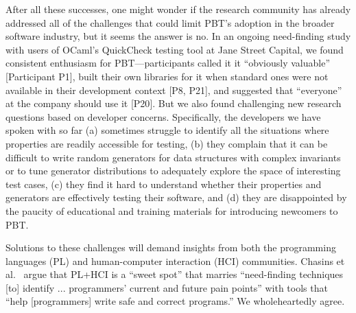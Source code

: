 \newcommand{\participant}[1]{{P#1}}

After all these successes, one might wonder if the research community has already
addressed all of the challenges that could limit PBT's adoption
in the broader software industry, but it
seems the answer is no.
In an ongoing need-finding study with users of OCaml's QuickCheck testing tool
at Jane Street Capital, we found
consistent enthusiasm for PBT---participants called it it
``obviously valuable'' [Participant \participant{1}],
built their own libraries for it when standard ones were not available in their
development context [\participant{8},
\participant{21}], and suggested that ``everyone'' at the company should use it
[\participant{20}]. But we also found
challenging new research questions based on developer concerns.
Specifically, the developers we have spoken with so far
%
(a) sometimes struggle
to identify all the situations where properties are readily accessible for
testing,
%
(b) they complain that it
can be difficult to write random generators for data structures
with complex invariants or to tune generator distributions to
adequately explore the space of interesting test cases,
%
(c) they find
it hard to understand whether their properties and generators are
effectively testing their software, and
%
(d) they are disappointed by
the paucity of educational and training materials for introducing
newcomers to PBT.\iflater{}\fi

Solutions to these challenges will demand insights from both the
programming languages (PL) and
human-computer interaction (HCI) communities.  Chasins et
al.~\cite{chasins_pl_2021} argue that PL+HCI is a ``sweet spot'' that marries
``need-finding techniques [to] identify ...  programmers' current and future
pain points'' with tools that ``help [programmers] write safe and correct
programs.'' We wholeheartedly agree.

